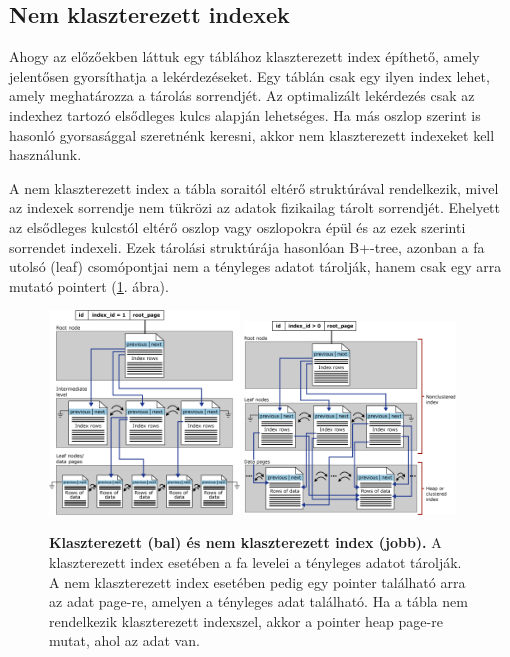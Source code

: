 \documentclass[12pt]{article}
\theoremstyle{plain}
\begin{document}
\subsection{Nem klaszterezett indexek}
Ahogy az előzőekben láttuk egy táblához klaszterezett index építhető, amely jelentősen gyorsíthatja a lekérdezéseket. Egy táblán csak egy ilyen index lehet, amely meghatározza a tárolás sorrendjét. Az optimalizált lekérdezés csak az indexhez tartozó elsődleges kulcs alapján lehetséges. Ha más oszlop szerint is hasonló gyorsasággal szeretnénk keresni, akkor nem klaszterezett indexeket kell használunk.
\par
A nem klaszterezett index a tábla soraitól eltérő struktúrával rendelkezik, mivel az indexek sorrendje nem tükrözi az adatok fizikailag tárolt sorrendjét. Ehelyett az elsődleges kulcstól eltérő oszlop vagy oszlopokra épül és az ezek szerinti sorrendet indexeli. Ezek tárolási struktúrája hasonlóan B+-tree, azonban a fa utolsó (leaf) csomópontjai nem a tényleges adatot tárolják, hanem csak egy arra mutató pointert (\ref{fig:idx}. ábra).

\begin{figure}[H]
    \begin{center}
    \includegraphics[width=0.45\textwidth]{media/cluster.png}
    \includegraphics[width=0.5\textwidth]{media/noncluster.png}
    \caption{\textbf{Klaszterezett (bal) és nem klaszterezett index (jobb).} A klaszterezett index esetében a fa levelei a tényleges adatot tárolják. A nem klaszterezett index esetében pedig egy pointer található arra az adat page-re, amelyen a tényleges adat található. Ha a tábla nem rendelkezik klaszterezett indexszel, akkor a pointer heap page-re mutat, ahol az adat van.} 
    \label{fig:idx}
    \end{center}
\end{figure}
\end{document}
